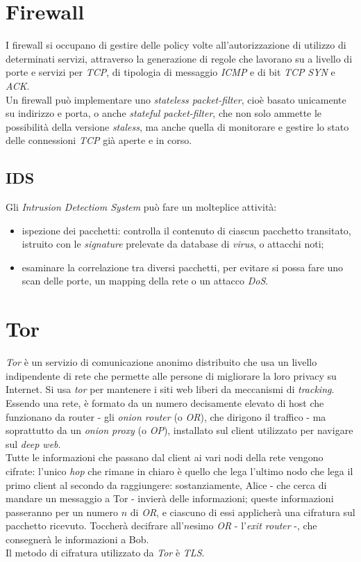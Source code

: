 \section{Firewall}
I firewall si occupano di gestire delle policy volte all'autorizzazione di utilizzo di determinati servizi, attraverso la generazione di regole che lavorano su a livello di porte e servizi per \textit{TCP}, di tipologia di messaggio \textit{ICMP} e di bit \textit{TCP} \textit{SYN} e \textit{ACK}. \\
Un firewall può implementare uno \textit{stateless packet-filter}, cioè basato unicamente su indirizzo e porta, o anche \textit{stateful packet-filter}, che non solo ammette le possibilità della versione \textit{staless}, ma anche quella di monitorare e gestire lo stato delle connessioni \textit{TCP} già aperte e in corso.

\subsection{IDS}
Gli \textit{Intrusion Detectiom System} può fare un molteplice attività:
\begin{itemize}
	\item ispezione dei pacchetti: controlla il contenuto di ciascun pacchetto transitato, istruito con le \textit{signature} prelevate da database di \textit{virus}, o attacchi noti;
	\item esaminare la correlazione tra diversi pacchetti, per evitare si possa fare uno scan delle porte, un mapping della rete o un attacco \textit{DoS}.
\end{itemize}

\section{Tor}
\textit{Tor} è un servizio di comunicazione anonimo distribuito che usa un livello indipendente di rete che permette alle persone di migliorare la loro privacy su Internet. Si usa \textit{tor} per mantenere i siti web liberi da meccanismi di \textit{tracking}. \\
Essendo una rete, è formato da un numero decisamente elevato di host che funzionano da router - gli \textit{onion router} (o \textit{OR}), che dirigono il traffico - ma soprattutto da un \textit{onion proxy} (o \textit{OP}), installato sul client utilizzato per navigare sul \textit{deep web}. \\
Tutte le informazioni che passano dal client ai vari nodi della rete vengono cifrate: l'unico \textit{hop} che rimane in chiaro è quello che lega l'ultimo nodo che lega il primo client al secondo da raggiungere: sostanziamente, Alice - che cerca di mandare un messaggio a Tor - invierà delle informazioni; queste informazioni passeranno per un numero $n$ di \textit{OR}, e ciascuno di essi applicherà una cifratura sul pacchetto ricevuto. Toccherà decifrare all'$n$esimo \textit{OR} - l'\textit{exit router} -, che consegnerà le informazioni a Bob. \\
Il metodo di cifratura utilizzato da \textit{Tor} è \textit{TLS}.
